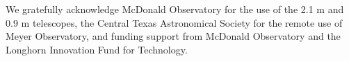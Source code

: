 \documentclass[preprint2]{aastex}
\begin{document}
\acknowledgments

We gratefully acknowledge McDonald Observatory for the use of the 2.1 m and 0.9 m telescopes, the Central Texas Astronomical Society for the remote use of Meyer Observatory, and funding support from McDonald Observatory and the Longhorn Innovation Fund for Technology.



\clearpage



\end{document}
